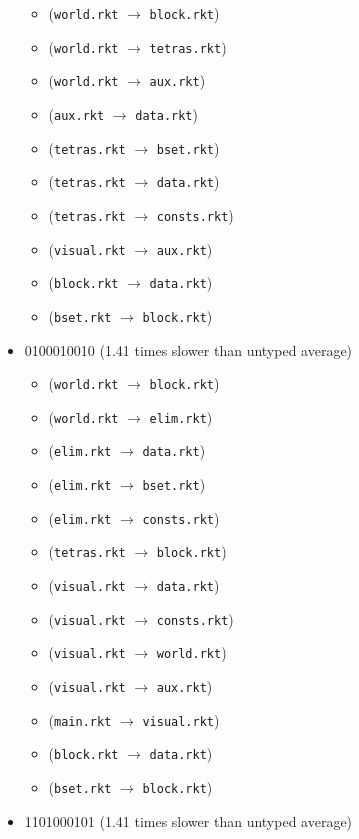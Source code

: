 \documentclass{article}
\newcommand{\mono}[1]{\texttt{#1}}
\begin{document}
\begin{itemize}
  \begin{itemize}
  \item (\mono{world.rkt} $\rightarrow$ \mono{block.rkt})
  \item (\mono{world.rkt} $\rightarrow$ \mono{tetras.rkt})
  \item (\mono{world.rkt} $\rightarrow$ \mono{aux.rkt})
  \item (\mono{aux.rkt} $\rightarrow$ \mono{data.rkt})
  \item (\mono{tetras.rkt} $\rightarrow$ \mono{bset.rkt})
  \item (\mono{tetras.rkt} $\rightarrow$ \mono{data.rkt})
  \item (\mono{tetras.rkt} $\rightarrow$ \mono{consts.rkt})
  \item (\mono{visual.rkt} $\rightarrow$ \mono{aux.rkt})
  \item (\mono{block.rkt} $\rightarrow$ \mono{data.rkt})
  \item (\mono{bset.rkt} $\rightarrow$ \mono{block.rkt})
  \end{itemize}
\item 0100010010 (1.41 times slower than untyped average)
  \begin{itemize}
  \item (\mono{world.rkt} $\rightarrow$ \mono{block.rkt})
  \item (\mono{world.rkt} $\rightarrow$ \mono{elim.rkt})
  \item (\mono{elim.rkt} $\rightarrow$ \mono{data.rkt})
  \item (\mono{elim.rkt} $\rightarrow$ \mono{bset.rkt})
  \item (\mono{elim.rkt} $\rightarrow$ \mono{consts.rkt})
  \item (\mono{tetras.rkt} $\rightarrow$ \mono{block.rkt})
  \item (\mono{visual.rkt} $\rightarrow$ \mono{data.rkt})
  \item (\mono{visual.rkt} $\rightarrow$ \mono{consts.rkt})
  \item (\mono{visual.rkt} $\rightarrow$ \mono{world.rkt})
  \item (\mono{visual.rkt} $\rightarrow$ \mono{aux.rkt})
  \item (\mono{main.rkt} $\rightarrow$ \mono{visual.rkt})
  \item (\mono{block.rkt} $\rightarrow$ \mono{data.rkt})
  \item (\mono{bset.rkt} $\rightarrow$ \mono{block.rkt})
  \end{itemize}
\item 1101000101 (1.41 times slower than untyped average)

\end{itemize}
\end{document}
